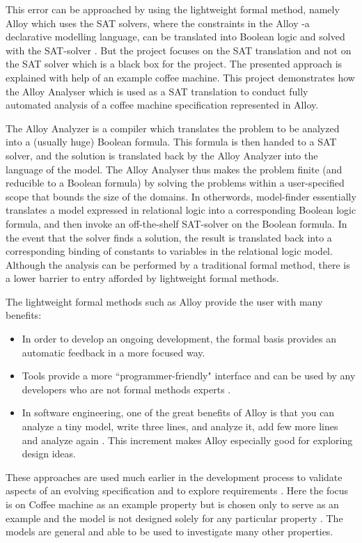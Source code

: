 \documentclass[a4paper,10pt]{report}
\begin{document}
This error can be approached by using the lightweight formal method, namely Alloy which uses the SAT solvers, where the constraints in the Alloy -a declarative modelling language, can be translated into Boolean logic and solved with the SAT-solver \cite{Yeung2005}. But the project focuses on the SAT translation and not on the  SAT solver which is a black box for the project. The presented approach is explained with help of an example coffee machine. This project demonstrates how the Alloy Analyser which is used as a SAT translation to conduct fully automated analysis of a coffee machine specification represented in Alloy. 

The Alloy Analyzer is a compiler which translates the problem to be analyzed into a (usually huge) Boolean formula. This formula is then handed to a SAT solver, and the solution is translated back by the Alloy Analyzer into the language of the model. The Alloy Analyser thus makes the problem finite (and reducible to a Boolean formula) by solving the problems within a user-specified scope that bounds the size of the domains. In otherwords, model-finder essentially translates a model expressed in relational logic into a corresponding Boolean logic formula, and then invoke an off-the-shelf SAT-solver on the Boolean formula. In the event that the solver finds a solution, the result is translated back into a corresponding binding of constants to variables in the relational logic model. Although the analysis can be performed by a traditional formal method, there is a lower barrier to entry afforded by lightweight formal methods.

The lightweight formal methods such as Alloy provide the user with many benefits:
\begin{itemize}
\item {In order to develop an ongoing development, the formal basis provides an automatic feedback in a more focused way.}
\item {Tools provide a more ``programmer-friendly" interface and can be used by any developers who are not formal methods experts} \cite{Boyatt}.
\item {In software engineering, one of the great benefits of Alloy is that you can analyze a tiny model, write three lines, and analyze it, add few more lines and analyze again \cite{ErichGamma1995}. This increment makes Alloy especially good for exploring design ideas. }
\end{itemize}
These approaches are used much earlier in the development process to validate aspects of an evolving specification and to explore requirements \cite{Hoare1986}. Here the focus is on Coffee machine as an example property but is chosen only to serve as an example and the model is not designed solely for any particular property \cite{ErichGamma1995}. The models are general and able to be used to investigate many other properties.
 
\end{document}

